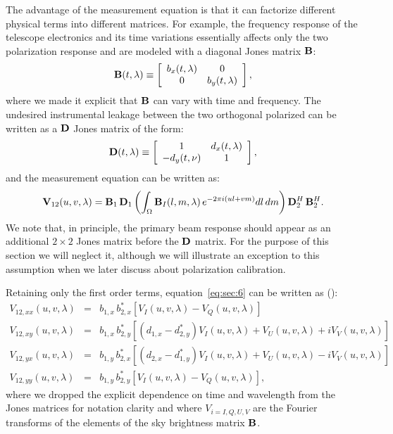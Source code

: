 The advantage of the measurement equation is that it can factorize different physical terms into different matrices. For example, the frequency response of the telescope electronics and its time variations essentially affects only the two polarization response and are modeled with a diagonal Jones matrix ${\bf B}$:
\begin{equation}
    {\bf B} (t,\lambda) \equiv 
    \left[
    \begin{array}{cc}
    b_x (t,\lambda) 	& 	0 	\\
    0 		& b_y (t,\lambda) 	\\
    \end{array}
    \right],   
\label{eq:sec:4}
\end{equation} 
where we made it explicit that ${\bf B}$ can vary with time and frequency. The undesired instrumental leakage between the two orthogonal polarized can be written as a ${\bf D}$ Jones matrix of the form:
\begin{equation}
    {\bf D} (t,\lambda) \equiv 
    \left[
    \begin{array}{cc}
    1	 		& d_x (t,\lambda)	\\
    -d_y (t,\nu)	& 1 	\\
    \end{array}
    \right],   
\label{eq:sec:5}
\end{equation} 
and the measurement equation can be written as:
\begin{equation}
{\bf V}_{12} (u,v,\lambda) = {\bf B}_1 \, {\bf D}_1 \left( \int_\Omega {\bf B}_I (l, m, \lambda) \, e^{-2 \pi i (ul + vm)} dl \, dm  \right) {\bf D}_2^H  \, {\bf B}_2^H.
\label{eq:sec:6}
\end{equation}
We note that, in principle, the primary beam response should appear as an additional $2 \times 2$ Jones matrix before the ${\bf D}$ matrix. For the purpose of this section we will neglect it, although we will illustrate an exception to this assumption when we later discuss about polarization calibration.

Retaining only the first order terms, equation~\ref{eq:sec:6} can be written as (\cite{sault96}):
\begin{eqnarray}
V_{12,xx} (u,v,\lambda) & = & b_{1,x} \, b_{2,x}^* [V_I (u,v,\lambda) - V_Q (u,v,\lambda)]\\
V_{12,xy} (u,v,\lambda) & = & b_{1,x} \, b_{2,y}^* [(d_{1,x} - d_{2,y}^*) V_I (u,v,\lambda) + V_U (u,v,\lambda) + iV_V (u,v,\lambda)]	\\
V_{12,yx} (u,v,\lambda) & = & b_{1,y} \, b_{2,x}^* [(d_{2,x} - d_{1,y}^*) V_I (u,v,\lambda) + V_U (u,v,\lambda) - iV_V (u,v,\lambda)]	\\
V_{12,yy} (u,v,\lambda) & = & b_{1,y} \, b_{2,y}^* [V_I (u,v,\lambda) - V_Q (u,v,\lambda)],
\label{eq:sec:7}
\end{eqnarray}
where we dropped the explicit dependence on time and wavelength from the Jones matrices for notation clarity and where $V_{i=I, Q, U, V}$ are the Fourier transforms of the elements of the sky brightness matrix ${\bf B}$.

